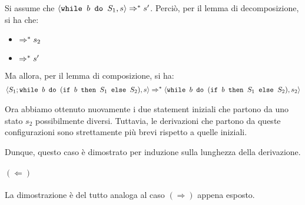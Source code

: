 Si assume che $\confSs{\wbS{b}{S_1}}{s} \Rar{*} s'$.
Perciò, per il lemma di decomposizione, si ha che:

\begin{itemize}
  \item {} $\Rar{*} s_2$
  \item {} $\Rar{*} s'$
\end{itemize}

Ma allora, per il lemma di composizione, si ha:
\begin{align*}
\confSs{S_1; \wbS{b}{(\ifABC{b}{S_1}{S_2})}}{s}
\Rar{*}
\confSs{\wbS{b}{(\ifABC{b}{S_1}{S_2})}}{s_2}
\end{align*}

Ora abbiamo ottenuto nuovamente i due statement iniziali che partono da uno
stato $s_2$ possibilmente diversi. Tuttavia, le derivazioni che partono da
queste configurazioni sono strettamente più brevi rispetto a quelle iniziali.

Dunque, questo caso è dimostrato per induzione sulla lunghezza della
derivazione.

\paragraph{$(\Leftarrow)$}

La dimostrazione è del tutto analoga al caso $(\Rightarrow)$ appena esposto.

